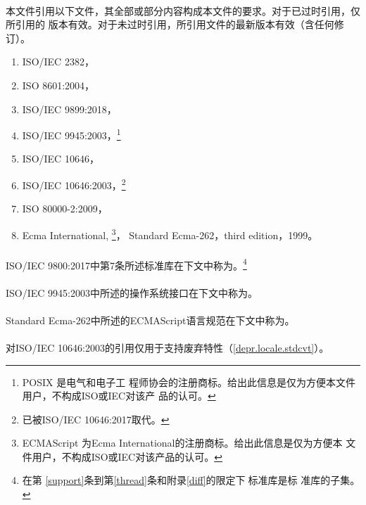 \paragraph{} %
本文件引用以下文件，其全部或部分内容构成本文件的要求。对于已过时引用，仅所引用的
版本有效。对于未过时引用，所引用文件的最新版本有效（含任何修订）。
\begin{enumerate}
  \item ISO/IEC 2382，
  \item ISO 8601:2004，
  \item ISO/IEC 9899:2018，
  \item ISO/IEC 9945:2003，\footnote{POSIX \textregistered{}是电气和电子工
        程师协会的注册商标。给出此信息是仅为方便本文件用户，不构成ISO或IEC对该产
        品的认可。}
  \item ISO/IEC 10646，
  \item ISO/IEC 10646:2003，\footnote{已被ISO/IEC 10646:2017取代。}
  \item ISO 80000-2:2009，
  \item Ecma International,  \footnote{ECMAScript
        \textregistered{}为Ecma International的注册商标。给出此信息是仅为方便本
        文件用户，不构成ISO或IEC对该产品的认可。}，
        Standard Ecma-262，third edition，1999。
\end{enumerate}

\paragraph{} %
ISO/IEC 9800:2017中第7条所述标准库在下文中称为。\footnote{在第
\ref{support}条到第\ref{thread}条和附录\ref{diff}的限定下，\c{}标准库是\cpp{}标
准库的子集。}

\paragraph{} %
ISO/IEC 9945:2003中所述的操作系统接口在下文中称为。

\paragraph{} %
Standard Ecma-262中所述的ECMAScript语言规范在下文中称为。

\paragraph{} %
\begin{note}
  对ISO/IEC 10646:2003的引用仅用于支持废弃特性（\ref{depr.locale.stdcvt}）。
\end{note}
